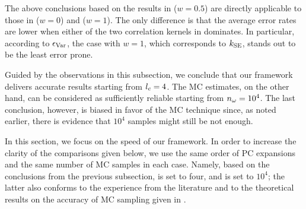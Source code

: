 The above conclusions based on the results in  ($w =
0.5$) are directly applicable to those in  ($w = 0$) and
 ($w = 1$). The only difference is that the average
error rates are lower when either of the two correlation kernels in
 dominates. In particular, according to
$\epsilon_{\variance}$, the case with $w = 1$, which corresponds to $k_{\mathrm{SE}}$,
stands out to be the least error prone.

Guided by the observations in this subsection, we conclude that our framework
delivers accurate results starting from ${l_{c}} = 4$. The \ac{MC} estimates, on
the other hand, can be considered as sufficiently reliable starting from ${n_{\omega}} =
10^4$. The last conclusion, however, is biased in favor of the \ac{MC}
technique since, as noted earlier, there is evidence that $10^4$ samples might
still be not enough.


In this section, we focus on the speed of our framework. In order to increase
the clarity of the comparisons given below, we use the same order of PC
expansions and the same number of MC samples in each case. Namely, based on the
conclusions from the previous subsection, \lc is set to four, and \ns is set to
$10^4$; the latter also conforms to the experience from the literature
\cite{huang2009, lee2013, shen2009, bhardwaj2008, ghanta2006} and to the
theoretical results on the accuracy of MC sampling given in
\cite{diaz-emparanza2002}.

